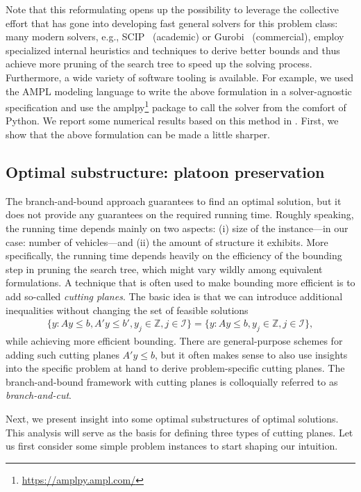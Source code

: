 \documentclass{report}
\theoremstyle{definition}
\theoremstyle{plain}
\begin{document}
Note that this reformulating opens up the possibility to leverage the collective
effort that has gone into developing fast general solvers for this problem
class: many modern solvers, e.g., SCIP~\cite{BolusaniEtal2024OO} (academic) or
Gurobi~\cite{gurobi} (commercial), employ specialized internal heuristics and
techniques to derive better bounds and thus achieve more pruning of the search
tree to speed up the solving process.
%
Furthermore, a wide variety of software tooling is available. For example, we
used the AMPL modeling language to write the above formulation in a
solver-agnostic specification and use the
amplpy\footnote{\url{https://amplpy.ampl.com/}} package to call the solver from
the comfort of Python.
%
We report some numerical results based on this method in
. First, we show that the above formulation can be made
a little sharper.


\subsection{Optimal substructure: platoon preservation}\label{sec:platoons}

The branch-and-bound approach guarantees to find an optimal solution, but it
does not provide any guarantees on the required running time.
%
Roughly speaking, the running time depends mainly on two aspects: (i) size of
the instance---in our case: number of vehicles---and (ii) the amount of structure it
exhibits.
%
More specifically, the running time depends heavily on the efficiency of the
bounding step in pruning the search tree, which might vary wildly among
equivalent formulations.
%
A technique that is often used to make bounding more efficient is to add
so-called \emph{cutting planes}.
%
The basic idea is that we can introduce additional inequalities
without changing the set of feasible solutions
\begin{align}
  \{ y : Ay \leq b, A'y \leq b', y_j \in \mathbb{Z}, j \in \mathcal{I} \} = \{ y : Ay \leq b, y_j \in \mathbb{Z}, j \in \mathcal{I} \} ,
\end{align}
while achieving more efficient bounding.
%
There are general-purpose schemes for adding such cutting planes $A' y \leq b$,
but it often makes sense to also use insights into the specific problem at hand
to derive problem-specific cutting planes.
%
The branch-and-bound framework with cutting planes is colloquially referred to as
\emph{branch-and-cut}.

Next, we present insight into some optimal substructures of optimal solutions.
This analysis will serve as the basis for defining three types of cutting
planes.
%
Let us first consider some simple problem instances to start shaping our
intuition.
\end{document}
